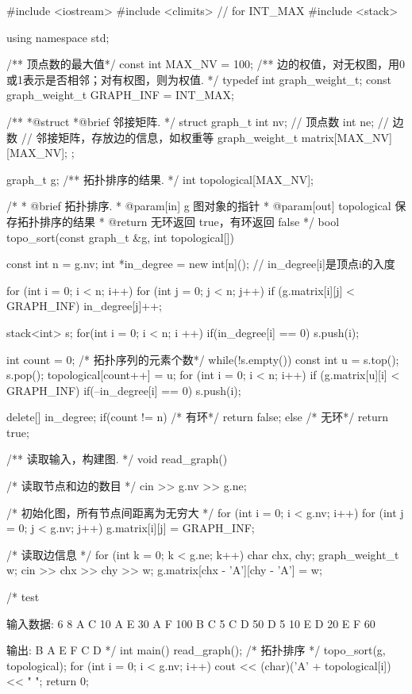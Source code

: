 \begin{Codex}[label=am_graph_topo_sort.cpp]
#include <iostream>
#include <climits>  // for INT_MAX
#include <stack>

using namespace std;

/** 顶点数的最大值*/
const int MAX_NV = 100;
/** 边的权值，对无权图，用0或1表示是否相邻；对有权图，则为权值. */
typedef int graph_weight_t;
const graph_weight_t GRAPH_INF = INT_MAX;

/**
 *@struct
 *@brief 邻接矩阵.
 */
struct graph_t {
    int nv; // 顶点数
    int ne; // 边数
    // 邻接矩阵，存放边的信息，如权重等
    graph_weight_t matrix[MAX_NV][MAX_NV];
};

graph_t g;
/** 拓扑排序的结果. */
int topological[MAX_NV];

/*
  * @brief 拓扑排序.
  * @param[in] g 图对象的指针
  * @param[out] topological 保存拓扑排序的结果
  * @return 无环返回 true，有环返回 false
  */
bool topo_sort(const graph_t &g, int topological[]) {
    const int n = g.nv;
    int *in_degree = new int[n](); // in_degree[i]是顶点i的入度

    for (int i = 0; i < n; i++) {
        for (int j = 0; j < n; j++) {
            if (g.matrix[i][j] < GRAPH_INF)
                in_degree[j]++;
        }
    }

    stack<int> s;
    for(int i = 0; i < n; i ++) {
        if(in_degree[i] == 0)
            s.push(i);
    }

    int count = 0; /* 拓扑序列的元素个数*/
    while(!s.empty()) {
        const int u = s.top(); s.pop();
        topological[count++] = u;
        for (int i = 0; i < n; i++) if (g.matrix[u][i] < GRAPH_INF) {
            if(--in_degree[i] == 0) s.push(i);
        }
    }

    delete[] in_degree;
    if(count != n) { /* 有环*/
        return false;
    } else { /* 无环*/
        return true;
    }
}

/** 读取输入，构建图. */
void read_graph() {
    /* 读取节点和边的数目 */
    cin >> g.nv >> g.ne;

    /* 初始化图，所有节点间距离为无穷大 */
    for (int i = 0; i < g.nv; i++) {
        for (int j = 0; j < g.nv; j++) {
            g.matrix[i][j] = GRAPH_INF;
        }
    }

    /* 读取边信息 */
    for (int k = 0; k < g.ne; k++) {
        char chx, chy;
        graph_weight_t w;
        cin >> chx >> chy >> w;
        g.matrix[chx - 'A'][chy - 'A'] = w;
    }
}

/* test

输入数据:
6 8
A C 10
A E 30
A F 100
B C 5
C D 50
D 5 10
E D 20
E F 60

输出:
B A E F C D
*/
int main() {
    read_graph();
    /* 拓扑排序 */
    topo_sort(g, topological);
    for (int i = 0; i < g.nv; i++) {
        cout << (char)('A' + topological[i]) << " ";
    }
    return 0;
}
\end{Codex}

